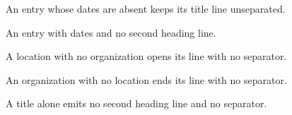 \documentclass[entrymeta=inline]{careerdossier-resume}
\begin{document}
\MakeCDossierHeader
{}
\begin{CDossierEntry}[
  title        = {Dateless Engineer},
  organization = {Example Labs},
  location     = {Toronto, ON}
]
  \begin{CDossierItemize}
    \item An entry whose dates are absent keeps its title line unseparated.
  \end{CDossierItemize}
\end{CDossierEntry}
\begin{CDossierEntry}[
  title = {Independent Consultant},
  dates = {2021--2023}
]
  \begin{CDossierItemize}
    \item An entry with dates and no second heading line.
  \end{CDossierItemize}
\end{CDossierEntry}
\begin{CDossierEntry}[
  title    = {Volunteer Reviewer},
  location = {Remote}
]
  \begin{CDossierItemize}
    \item A location with no organization opens its line with no separator.
  \end{CDossierItemize}
\end{CDossierEntry}
\begin{CDossierEntry}[
  title        = {Workshop Facilitator},
  organization = {Example Trust}
]
  \begin{CDossierItemize}
    \item An organization with no location ends its line with no separator.
  \end{CDossierItemize}
\end{CDossierEntry}
\begin{CDossierEntry}[
  title = {Title Only}
]
  \begin{CDossierItemize}
    \item A title alone emits no second heading line and no separator.
  \end{CDossierItemize}
\end{CDossierEntry}
\end{document}
